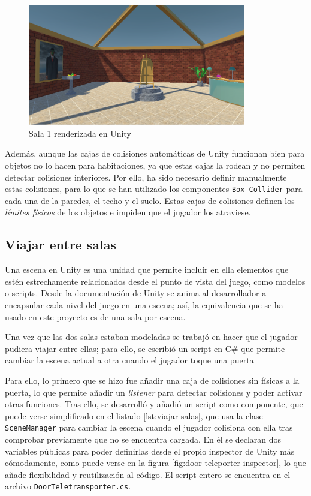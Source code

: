 \begin{figure}[!h]
\begin{center}
\includegraphics[width=0.85\textwidth]{imagenes/7/salas-unity/unity-sala-1.png}
\caption{Sala 1 renderizada en Unity}
\label{fig:unity-sala-1}
\end{center}
\end{figure}

Además, aunque las cajas de colisiones automáticas de Unity funcionan bien para objetos no lo hacen para habitaciones, ya que estas cajas la rodean y no permiten detectar colisiones interiores. Por ello, ha sido necesario definir manualmente estas colisiones, para lo que se han utilizado los componentes \texttt{Box Collider} para cada una de la paredes, el techo y el suelo. Estas cajas de colisiones definen los \textit{límites físicos} de los objetos e impiden que el jugador los atraviese.

\subsection{Viajar entre salas}

Una escena en Unity es una unidad que permite incluir en ella elementos que estén estrechamente relacionados desde el punto de vista del juego, como modelos o scripts. Desde la documentación de Unity se anima al desarrollador a encapsular cada nivel del juego en una escena; así, la equivalencia que se ha usado en este proyecto es de una sala por escena.

Una vez que las dos salas estaban modeladas se trabajó en hacer que el jugador pudiera viajar entre ellas; para ello, se escribió un script en C\# que permite cambiar la escena actual a otra cuando el jugador toque una puerta 

Para ello, lo primero que se hizo fue añadir una caja de colisiones sin físicas a la puerta, lo que permite añadir un \textit{listener} para detectar colisiones y poder activar otras funciones. Tras ello, se desarrolló y añadió un script como componente, que puede verse simplificado en el listado \ref{lst:viajar-salas}, que usa la clase \texttt{SceneManager} para cambiar la escena cuando el jugador colisiona con ella tras comprobar previamente que no se encuentra cargada. En él se declaran dos variables públicas para poder definirlas desde el propio inspector de Unity más cómodamente, como puede verse en la figura \ref{fig:door-teleporter-inspector}, lo que añade flexibilidad y reutilización al código. El script entero se encuentra en el archivo \texttt{DoorTeletransporter.cs}.

